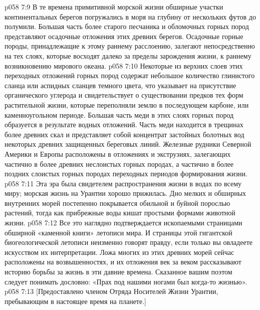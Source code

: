\vs p058 7:9 В те времена примитивной морской жизни обширные участки континентальных берегов погружались в моря на глубину от нескольких футов до полумили. Большая часть более старого песчаника и обломочных горных пород представляют осадочные отложения этих древних берегов. Осадочные горные породы, принадлежащие к этому раннему расслоению, залегают непосредственно на тех слоях, которые восходят далеко за пределы зарождения жизни, к раннему возникновению мирового океана.
\vs p058 7:10 Некоторые из верхних слоев этих переходных отложений горных пород содержат небольшое количество глинистого сланца или аспидных сланцев темного цвета, что указывает на присутствие органического углерода и свидетельствует о существовании предков тех форм растительной жизни, которые переполняли землю в последующем карбоне, или каменноугольном периоде. Большая часть меди в этих слоях горных пород образуется в результате водных отложений. Часть меди находится в трещинах более древних скал и представляет собой концентрат застойных болотных вод некоторых древних защищенных береговых линий. Железные рудники Северной Америки и Европы расположены в отложениях и экструзиях, залегающих частично в более древних неслоистых горных породах, а частично в более поздних слоистых горных породах переходных периодов формирования жизни.
\vs p058 7:11 \pc Эта эра была свидетелем распространения жизни в водах по всему миру; морская жизнь на Урантии хорошо прижилась. Дно мелких и обширных внутренних морей постепенно покрывается обильной и буйной порослью растений, тогда как прибрежные воды кишат простыми формами животной жизни.
\vs p058 7:12 \pc Все это наглядно подтверждается ископаемыми страницами обширной «каменной книги» летописи мира. И страницы этой гигантской биогеологической летописи неизменно говорят правду, если только вы овладеете искусством их интерпретации. Ложа многих из этих древних морей сейчас расположены на возвышенностях, и их отложения век за веком рассказывают историю борьбы за жизнь в эти давние времена. Сказанное вашим поэтом следует понимать дословно: «Прах под нашими ногами был когда\hyp{}то жизнью».
\vsetoff
\vs p058 7:13 [Предоставлено членом Отряда Носителей Жизни Урантии, пребывающим в настоящее время на планете.]
